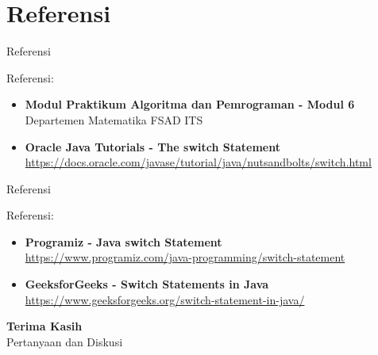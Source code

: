 \documentclass{beamer}
\begin{document}
\section{Referensi}
\begin{frame}{Referensi}
  \begin{block}{Referensi:}
    \begin{itemize}
      \item \textbf{Modul Praktikum Algoritma dan Pemrograman - Modul 6}\\
            Departemen Matematika FSAD ITS
      \item \textbf{Oracle Java Tutorials - The switch Statement}\\
            \url{https://docs.oracle.com/javase/tutorial/java/nutsandbolts/switch.html}
    \end{itemize}
  \end{block}
\end{frame}

\begin{frame}{Referensi}
  \begin{block}{Referensi:}
    \begin{itemize}
      \item \textbf{Programiz - Java switch Statement}\\
            \url{https://www.programiz.com/java-programming/switch-statement}
    \item \textbf{GeeksforGeeks - Switch Statements in Java}\\
            \url{https://www.geeksforgeeks.org/switch-statement-in-java/}
    \end{itemize}
  \end{block}
\end{frame}

\begin{frame}[standout]
  \Huge \textbf{Terima Kasih} \\[1.5em]
  \Large Pertanyaan dan Diskusi
\end{frame}
\end{document}

